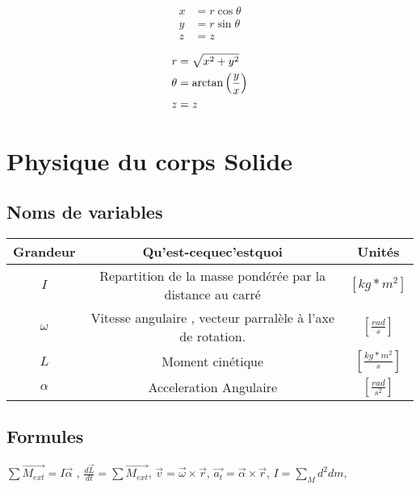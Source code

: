 \documentclass[10pt,a4paper]{article}
\begin{document}
\begin{multicols}{3}

\begin{align*}
x &= r  \cos\theta \\
y &= r  \sin\theta \\
z &= z
\end{align*}

\columnbreak



\columnbreak

\begin{align*}
r & = \sqrt{x^2 + y^2}\\
\theta & = \arctan\left({y \over x}\right) \\
z & = z
\end{align*}

\end{multicols}

\section{Physique du corps Solide}

\subsection{Noms de variables}

\begin{tabular}{|c|c|c|}
\hline 
Grandeur & Qu'est-cequec'estquoi & Unités \\ 
\hline 
$I$ & Repartition de la masse pondérée par la distance au carré & $[kg*m^2]$ \\ 
\hline
$\omega$ & Vitesse angulaire , vecteur parralèle à l'axe de rotation. & $[\frac{rad}{s}]$ \\ 
\hline
$L$ & Moment cinétique & $[\frac{kg*m^2}{s}]$ \\
\hline
$\alpha$ & Acceleration Angulaire & $[\frac{rad}{s^2}]$ \\
\hline
\end{tabular}

\subsection{Formules}
$\sum \vec{M_{ext}} = I\vec{\alpha}$ ,
$\frac{d\vec{L}}{dt} = \sum \vec{M_{ext}}$,
$\vec{v} = \vec{\omega} \times \vec{r}$,
$\vec{a_t} = \vec{\alpha} \times \vec{r}$,
$I = \sum \limits_M d^2 dm$,
\end{document}
